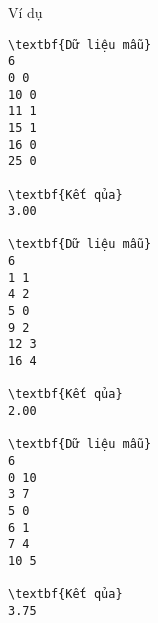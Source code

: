 Ví dụ
\begin{verbatim}
\textbf{Dữ liệu mẫu}
6 
0 0 
10 0 
11 1 
15 1 
16 0 
25 0

\textbf{Kết qủa}
3.00

\textbf{Dữ liệu mẫu}
6
1 1
4 2
5 0
9 2
12 3
16 4

\textbf{Kết qủa}
2.00

\textbf{Dữ liệu mẫu}
6
0 10
3 7
5 0
6 1
7 4
10 5

\textbf{Kết qủa}
3.75
\end{verbatim}